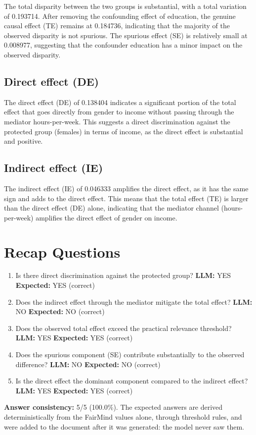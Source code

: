\documentclass[11pt]{article}
\begin{document}
The total disparity between the two groups is substantial, with a total variation of 0.193714. After removing the confounding effect of education, the genuine causal effect (TE) remains at 0.184736, indicating that the majority of the observed disparity is not spurious. The spurious effect (SE) is relatively small at 0.008977, suggesting that the confounder education has a minor impact on the observed disparity.

\subsection{Direct effect (DE)}

The direct effect (DE) of 0.138404 indicates a significant portion of the total effect that goes directly from gender to income without passing through the mediator hours-per-week. This suggests a direct discrimination against the protected group (females) in terms of income, as the direct effect is substantial and positive.

\subsection{Indirect effect (IE)}

The indirect effect (IE) of 0.046333 amplifies the direct effect, as it has the same sign and adds to the direct effect. This means that the total effect (TE) is larger than the direct effect (DE) alone, indicating that the mediator channel (hours-per-week) amplifies the direct effect of gender on income.

\section{Recap Questions}

\begin{enumerate}
\item Is there direct discrimination against the protected group? \textbf{LLM:} YES \quad \textbf{Expected:} YES \quad (correct)
\item Does the indirect effect through the mediator mitigate the total effect? \textbf{LLM:} NO \quad \textbf{Expected:} NO \quad (correct)
\item Does the observed total effect exceed the practical relevance threshold? \textbf{LLM:} YES \quad \textbf{Expected:} YES \quad (correct)
\item Does the spurious component (SE) contribute substantially to the observed difference? \textbf{LLM:} NO \quad \textbf{Expected:} NO \quad (correct)
\item Is the direct effect the dominant component compared to the indirect effect? \textbf{LLM:} YES \quad \textbf{Expected:} YES \quad (correct)
\end{enumerate}


\vspace{1em}
\noindent\textbf{Answer consistency:} 5/5 (100.0\%). The expected answers are derived deterministically from the FairMind values alone, through threshold rules, and were added to the document after it was generated: the model never saw them.
\end{document}
